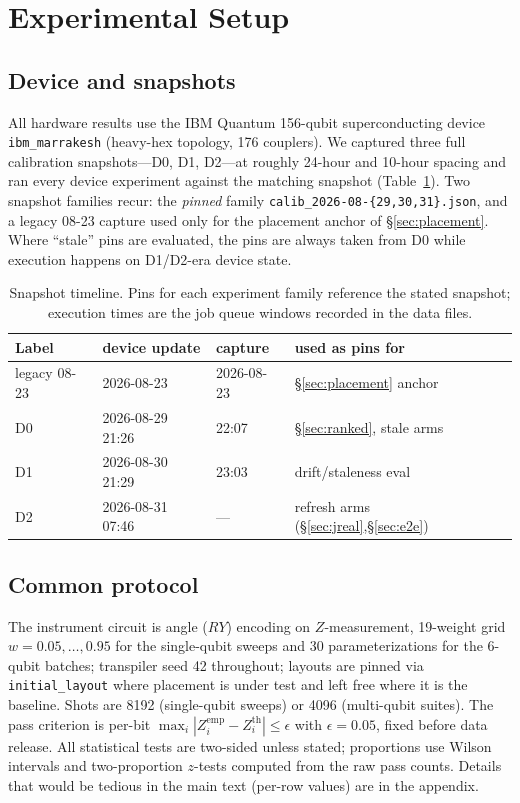 \documentclass[journal,10pt,twocolumn]{IEEEtran}
\begin{document}
\section{Experimental Setup}
\label{sec:setup}
\subsection{Device and snapshots}
All hardware results use the IBM Quantum 156-qubit superconducting device \texttt{ibm\_marrakesh} (heavy-hex
topology, 176 couplers). We captured three full calibration snapshots---D0, D1, D2---at roughly 24-hour and 10-hour
spacing and ran every device experiment against the matching snapshot (Table~\ref{tab:snap}). Two snapshot
families recur: the \emph{pinned} family \texttt{calib\_2026-08-\{29,30,31\}.json}, and a legacy 08-23 capture used
only for the placement anchor of \S\ref{sec:placement}. Where ``stale'' pins are evaluated, the pins are always
taken from D0 while execution happens on D1/D2-era device state.

\begin{table}[t]
\caption{Snapshot timeline. Pins for each experiment family reference the stated snapshot; execution times are the job
queue windows recorded in the data files.}
\label{tab:snap}
\centering
\footnotesize
\setlength{\tabcolsep}{4pt}
\begin{tabular}{@{}lllp{2.9cm}@{}}
\toprule
Label & device update & capture & used as pins for\\
\midrule
legacy 08-23 & 2026-08-23 & 2026-08-23 & \S\ref{sec:placement} anchor\\
D0 & 2026-08-29 21:26 & 22:07 & \S\ref{sec:ranked}, stale arms\\
D1 & 2026-08-30 21:29 & 23:03 & drift/staleness eval\\
D2 & 2026-08-31 07:46 & --- & refresh arms (\S\ref{sec:jreal},\S\ref{sec:e2e})\\
\bottomrule
\end{tabular}
\end{table}

\subsection{Common protocol}
The instrument circuit is angle ($RY$) encoding on $Z$-measurement, 19-weight grid $w{=}0.05,\dots,0.95$ for the
single-qubit sweeps and 30 parameterizations for the 6-qubit batches; transpiler seed 42 throughout; layouts are
pinned via \texttt{initial\_layout} where placement is under test and left free where it is the baseline. Shots are
8192 (single-qubit sweeps) or 4096 (multi-qubit suites). The pass criterion is per-bit
$\max_i|Z_i^{\mathrm{emp}}-Z_i^{\mathrm{th}}|\le\epsilon$ with $\epsilon{=}0.05$, fixed before data release. All
statistical tests are two-sided unless stated; proportions use Wilson intervals and two-proportion $z$-tests computed
from the raw pass counts. Details that would be tedious in the main text (per-row values) are in the appendix.
\end{document}
